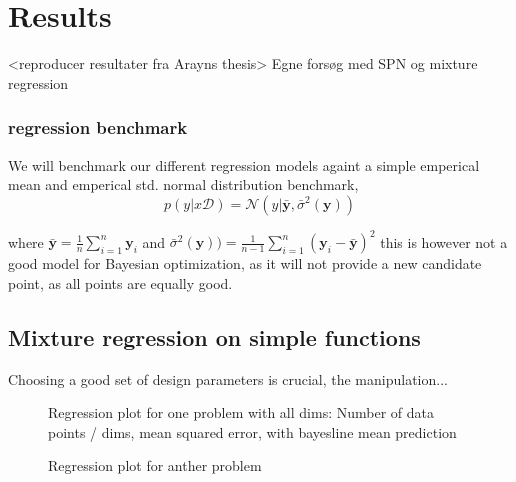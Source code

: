 \chapter{Results}
<reproducer resultater fra Arayns thesis>
Egne forsøg med SPN og mixture regression


\subsection{regression benchmark}
We will benchmark our different regression models againt a simple emperical mean and
emperical std. normal distribution benchmark, 
$$p(y|x\mathcal{D}) = \mathcal{N}(y| \bar{\textbf{y}} , \bar{\sigma}^2 (\textbf{y}))$$

where $\bar{\textbf{y}} = \frac{1}{n}\sum_{i=1}^n \textbf{y}_i $ and 
$\bar{\sigma}^2 (\textbf{y})) = \frac{1}{n-1}\sum_{i=1}^n (\textbf{y}_i-\bar{\textbf{y}})^2 $
this is however not a good model for Bayesian optimization, as it will not provide a
new candidate point, as all points are equally good. 


\section{Mixture regression on simple functions}
Choosing a good set of design parameters is crucial, 
the manipulation... 

\begin{figure}[h]
    \caption{Regression plot for one problem with all dims: Number of data points / dims, mean squared error, with bayesline mean prediction}
\end{figure}

\begin{figure}[h]
    \caption{Regression plot for anther problem}
\end{figure}

